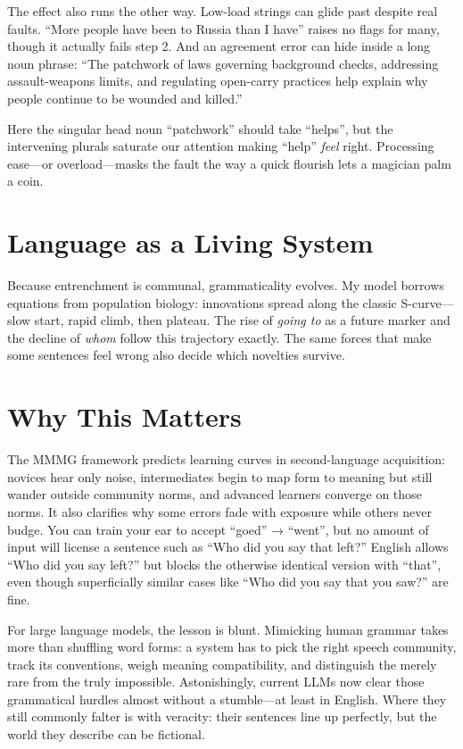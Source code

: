 \documentclass[12pt]{article}
\begin{document}
The effect also runs the other way. Low-load strings can glide past despite real faults. \enquote{More people have been to Russia than I have} raises no flags for many, though it actually fails step 2. And an agreement error can hide inside a long noun phrase: \enquote{The patchwork of laws governing background checks, addressing assault-weapons limits, and regulating open-carry practices help explain why people continue to be wounded and killed.} 

Here the singular head noun \enquote{patchwork} should take \enquote{helps}, but the intervening plurals saturate our attention making \enquote{help} \textit{feel} right. Processing ease—or overload—masks the fault the way a quick flourish lets a magician palm a coin.

\section*{Language as a Living System}

Because entrenchment is communal, grammaticality evolves. My model borrows equations from population biology: innovations spread along the classic S-curve—slow start, rapid climb, then plateau. The rise of \emph{going to} as a future marker and the decline of \emph{whom} follow this trajectory exactly. The same forces that make some sentences feel wrong also decide which novelties survive.

\section*{Why This Matters}

The MMMG framework predicts learning curves in second-language acquisition: novices hear only noise, intermediates begin to map form to meaning but still wander outside community norms, and advanced learners converge on those norms.  It also clarifies why some errors fade with exposure while others never budge.  You can train your ear to accept \enquote{goed} → \enquote{went}, but no amount of input will license a sentence such as \enquote{Who did you say that left?} English allows \enquote{Who did you say left?} but blocks the otherwise identical version with \enquote{that}, even though superficially similar cases like \enquote{Who did you say that you saw?} are fine.

For large language models, the lesson is blunt. Mimicking human grammar takes more than shuffling word forms: a system has to pick the right speech community, track its conventions, weigh meaning compatibility, and distinguish the merely rare from the truly impossible. Astonishingly, current LLMs now clear those grammatical hurdles almost without a stumble—at least in English. Where they still commonly falter is with veracity: their sentences line up perfectly, but the world they describe can be fictional.
\end{document}
